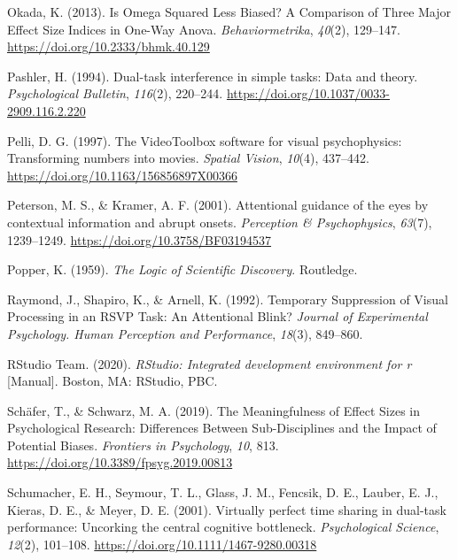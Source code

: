 \documentclass[
  man]{apa6}
\newlength{\cslhangindent}
\newlength{\cslentryspacingunit} %
\newenvironment{CSLReferences}[2] %
 {%
  \setlength{\parindent}{0pt}
  \ifodd #1
  \let\oldpar\par
  \def\par{\hangindent=\cslhangindent\oldpar}
  \fi
  \setlength{\parskip}{#2\cslentryspacingunit}
 }%
 {}
\begin{document}
\begin{CSLReferences}{1}{0}
\leavevmode{}%
Okada, K. (2013). Is {Omega Squared Less Biased}? A {Comparison} of {Three Major Effect Size Indices} in {One-Way Anova}. \emph{Behaviormetrika}, \emph{40}(2), 129--147. \url{https://doi.org/10.2333/bhmk.40.129}

\leavevmode{}%
Pashler, H. (1994). Dual-task interference in simple tasks: Data and theory. \emph{Psychological Bulletin}, \emph{116}(2), 220--244. \url{https://doi.org/10.1037/0033-2909.116.2.220}

\leavevmode{}%
Pelli, D. G. (1997). The {VideoToolbox} software for visual psychophysics: Transforming numbers into movies. \emph{Spatial Vision}, \emph{10}(4), 437--442. \url{https://doi.org/10.1163/156856897X00366}

\leavevmode{}%
Peterson, M. S., \& Kramer, A. F. (2001). Attentional guidance of the eyes by contextual information and abrupt onsets. \emph{Perception \& Psychophysics}, \emph{63}(7), 1239--1249. \url{https://doi.org/10.3758/BF03194537}

\leavevmode{}%
Popper, K. (1959). \emph{The {Logic} of {Scientific Discovery}}. {Routledge}.

\leavevmode{}%
Raymond, J., Shapiro, K., \& Arnell, K. (1992). Temporary {Suppression} of {Visual Processing} in an {RSVP Task}: {An Attentional Blink}? \emph{Journal of Experimental Psychology. Human Perception and Performance}, \emph{18}(3), 849--860.

\leavevmode{}%
RStudio Team. (2020). \emph{{RStudio}: {Integrated} development environment for r} {[}Manual{]}. {Boston, MA}: {RStudio, PBC.}

\leavevmode{}%
Schäfer, T., \& Schwarz, M. A. (2019). The {Meaningfulness} of {Effect Sizes} in {Psychological Research}: {Differences Between Sub-Disciplines} and the {Impact} of {Potential Biases}. \emph{Frontiers in Psychology}, \emph{10}, 813. \url{https://doi.org/10.3389/fpsyg.2019.00813}

\leavevmode{}%
Schumacher, E. H., Seymour, T. L., Glass, J. M., Fencsik, D. E., Lauber, E. J., Kieras, D. E., \& Meyer, D. E. (2001). Virtually perfect time sharing in dual-task performance: Uncorking the central cognitive bottleneck. \emph{Psychological Science}, \emph{12}(2), 101--108. \url{https://doi.org/10.1111/1467-9280.00318}


\end{CSLReferences}
\end{document}
